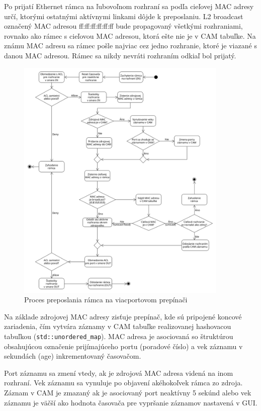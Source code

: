 \documentclass[12pt, a4paper]{article}
\begin{document}
Po prijatí Ethernet rámca na ľubovoľnom rozhraní sa podľa cieľovej MAC adresy určí, ktorými ostatnými aktívnymi 
linkami dôjde k preposlaniu. L2 broadcast označený MAC adresou ff:ff:ff:ff:ff:ff bude propagovaný všetkými rozhraniami, 
rovnako ako rámec s cieľovou MAC adresou, ktorá ešte nie je v CAM tabuľke. Na známu MAC adresu sa rámec pošle najviac cez jedno 
rozhranie, ktoré je viazané s danou MAC adresou. Rámec sa nikdy nevráti rozhraním odkiaľ bol prijatý. 
\begin{figure}[h!]
	\centering
	\includegraphics[width=0.9\textwidth]{assets/switch.png}
	\caption{Proces preposlania rámca na viacportovom prepínači}
\end{figure}
Na základe zdrojovej MAC adresy zisťuje prepínač, kde sú pripojené koncové zariadenia, čím vytvára záznamy v CAM tabuľke 
realizovanej hashovacou tabuľkou (\verb|std::unordered_map|). MAC adresa je asociovaná so štruktúrou obsahujúcou označenie 
prijímajúceho portu (poradové číslo) a vek záznamu v sekundách (age) inkrementovaný časovačom. 


Port záznamu sa zmení vtedy, ak je zdrojová MAC adresa videná na inom rozhraní. Vek záznamu sa vynuluje po objavení akéhokoľvek rámca zo 
zdroja. Záznam v CAM je zmazaný ak je asociovaný port neaktívny 5 sekúnd alebo vek záznamu je väčší ako hodnota časovača pre 
vypršanie záznamov nastavená v GUI.
\end{document}
